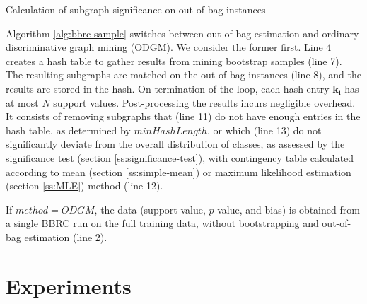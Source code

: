 \documentclass{sig-alternate}
\begin{document}
\begin{algorithm2e*}[t]
  \fontsize{8}{10}
  \selectfont
  \caption{Calculation of subgraph significance on out-of-bag instances\label{alg:bbrc-sample}}
\end{algorithm2e*}
Algorithm \ref{alg:bbrc-sample} switches between out-of-bag estimation and ordinary discriminative graph mining (ODGM).
We consider the former first.  Line 4
creates a hash table to gather results from mining bootstrap samples 
(line 7). The resulting subgraphs are matched on the out-of-bag instances (line
8), and the results are stored in the hash. On termination of the loop, each hash
entry $\mathbf{k_i}$ has at most $N$ support values. Post-processing the results
incurs negligible overhead. It
consists of removing subgraphs that (line 11) do not have enough entries in the hash table, as
determined by $minHashLength$, or which (line 13) do not significantly
deviate from the overall distribution of classes, as assessed by the significance
test (section \ref{ss:significance-test}), with contingency table calculated
according to mean (section \ref{ss:simple-mean}) or maximum likelihood
estimation (section \ref{ss:MLE}) method (line 12). 

If $method=ODGM$, the data (support value, $p$-value, and bias) is obtained from a single BBRC run on the full training data, without bootstrapping and out-of-bag estimation (line 2).



\section{Experiments}
\label{s:Experiments}
\end{document}
